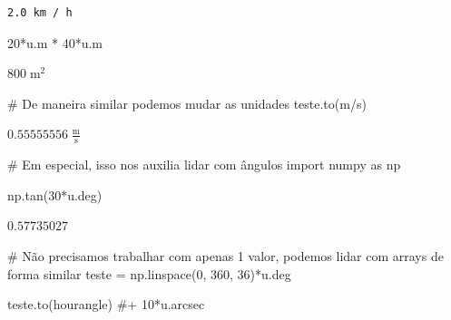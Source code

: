 \documentclass[
  letterpaper,
  DIV=11,
  numbers=noendperiod]{scrreprt}
\newenvironment{Shaded}{\begin{snugshade}}{\end{snugshade}}
\newcommand{\CommentTok}[1]{\textcolor[rgb]{0.37,0.37,0.37}{#1}}
\newcommand{\DecValTok}[1]{\textcolor[rgb]{0.68,0.00,0.00}{#1}}
\newcommand{\ImportTok}[1]{\textcolor[rgb]{0.00,0.46,0.62}{#1}}
\newcommand{\NormalTok}[1]{\textcolor[rgb]{0.00,0.23,0.31}{#1}}
\newcommand{\OperatorTok}[1]{\textcolor[rgb]{0.37,0.37,0.37}{#1}}
\newcommand{\StringTok}[1]{\textcolor[rgb]{0.13,0.47,0.30}{#1}}
\begin{document}
\begin{verbatim}
2.0 km / h
\end{verbatim}

\begin{Shaded}
\begin{Highlighting}[]
\DecValTok{20}\OperatorTok{*}\NormalTok{u.m }\OperatorTok{*} \DecValTok{40}\OperatorTok{*}\NormalTok{u.m}
\end{Highlighting}
\end{Shaded}

$800 \; \mathrm{m^{2}}$

\begin{Shaded}
\begin{Highlighting}[]
\CommentTok{\# De maneira similar podemos mudar as unidades}
\NormalTok{teste.to(}\StringTok{\textquotesingle{}m/s\textquotesingle{}}\NormalTok{)}
\end{Highlighting}
\end{Shaded}

$0.55555556 \; \mathrm{\frac{m}{s}}$

\begin{Shaded}
\begin{Highlighting}[]
\CommentTok{\# Em especial, isso nos auxilia lidar com ângulos}
\ImportTok{import}\NormalTok{ numpy }\ImportTok{as}\NormalTok{ np}

\NormalTok{np.tan(}\DecValTok{30}\OperatorTok{*}\NormalTok{u.deg)}
\end{Highlighting}
\end{Shaded}

$0.57735027 \; \mathrm{}$

\begin{Shaded}
\begin{Highlighting}[]
\CommentTok{\# Não precisamos trabalhar com apenas 1 valor, podemos lidar com arrays de forma similar}
\NormalTok{teste }\OperatorTok{=}\NormalTok{ np.linspace(}\DecValTok{0}\NormalTok{, }\DecValTok{360}\NormalTok{, }\DecValTok{36}\NormalTok{)}\OperatorTok{*}\NormalTok{u.deg}
\end{Highlighting}
\end{Shaded}

\begin{Shaded}
\begin{Highlighting}[]
\NormalTok{teste.to(}\StringTok{\textquotesingle{}hourangle\textquotesingle{}}\NormalTok{) }\CommentTok{\#+ 10*u.arcsec }
\end{Highlighting}
\end{Shaded}
\end{document}
